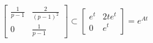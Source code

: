 \documentclass{article}
\begin{document}
\begin{large}
\vspace{0.5cm}
$
\begin{bmatrix}
\frac{1}{p-1}  & \frac{2}{(p-1)^2}\\
0 & \frac{1}{p-1}
\end{bmatrix}
\subset
\begin{bmatrix}
e^t & 2te^t\\
0 & e^t
\end{bmatrix}
=
e^{At}
$







\end{large}
\end{document}
